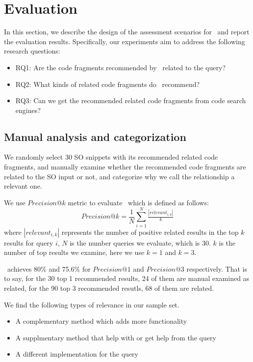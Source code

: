 \section{Evaluation}
\label{sec:Evaluation}
In this section, we describe the design of the assessment scenarios for \tool\ and report the evaluation results. Specifically, our experiments aim to address the following research questions:
\begin{itemize}
	\item RQ1: Are the code fragments recommended by \tool\ related to the query?
	\item RQ2: What kinds of related code fragments do \tool\ recommend?
	\item RQ3: Can we get the recommended related code fragments from code search engines?
\end{itemize}

\subsection{Manual analysis and categorization}
We randomly select 30 SO snippets with its recommended related code fragments, and manually examine whether the recommended code fragments are related to the SO input or not, and categorize why we call the relationship a relevant one.

We use $Precision@k$ metric to evaluate \tool\  which is defined as follows:
\begin{equation}
Precision@k = \frac{1}{N}\sum_{i=1}^{N}\tfrac{\left | relevant_{i,k} \right |}{k}
\end{equation}
where $\left | relevant_{i,k} \right |$ represents the number of positive related results in the top $k$ results for query $i$, $N$ is the number queries we evaluate, which is $30$. $k$ is the number of top results we examine, here we use $k=1$ and $k=3$.

\tool\ achieves 80\% and 75.6\% for $Precision@1$ and $Precision@3$ respectively. That is to say, for the 30 top 1 recommended results, 24 of them are manual examined as related, for the 90 top 3 recommended resutls, 68 of them are related.

We find the following types of relevance in our sample set.
\begin{itemize}
	\item A complementary method which adds more functionality
	\item A supplmentary method that help with or get help from the query 
	\item A different implementation for the query	
\end{itemize}

